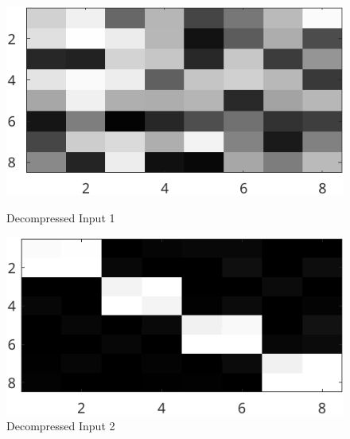 \documentclass{article}
\begin{document}
	\begin{figure}[ht]
  	\centering
  	\begin{minipage}[t]{0.45\textwidth}
    	\centering
    	\includegraphics[width=\textwidth]{2B_Decom1}
    	\caption{Decompressed Input 1}
    	\label{fig:2B_Decom1}
  	\end{minipage}\hfill
  	\begin{minipage}[t]{0.45\textwidth}
    	\centering
    	\includegraphics[width=\textwidth]{2B_Decom2}
    	\caption{Decompressed Input 2}
    	\label{fig:2B_Decom2}
  	\end{minipage}
	\end{figure}
\end{document}
